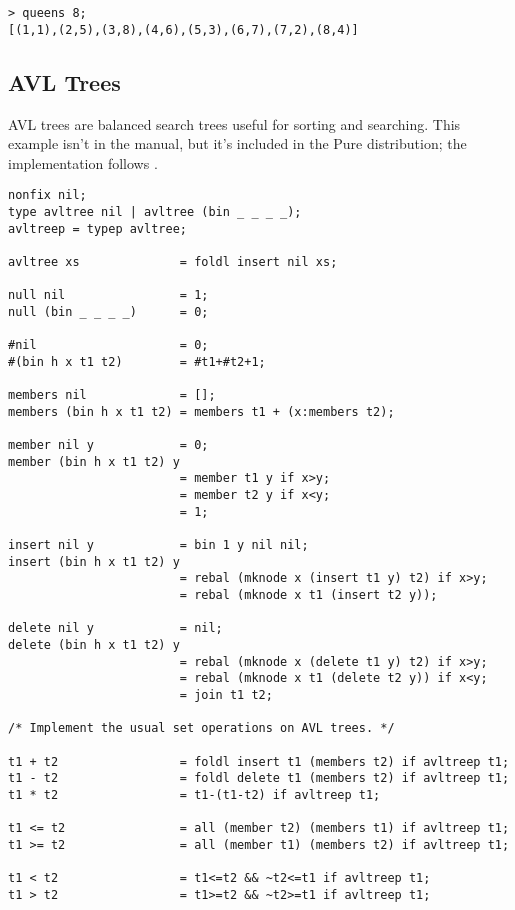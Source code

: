 \documentclass[a4paper,12pt]{article}
\begin{document}
\begin{lstlisting}
> queens 8;
[(1,1),(2,5),(3,8),(4,6),(5,3),(6,7),(7,2),(8,4)]
\end{lstlisting}

\subsection{AVL Trees}

AVL trees are balanced search trees useful for sorting and searching. This
example isn't in the manual, but it's included in the Pure distribution; the
implementation follows \cite{BiWa88}.

\begin{lstlisting}
nonfix nil;
type avltree nil | avltree (bin _ _ _ _);
avltreep = typep avltree;

avltree xs              = foldl insert nil xs;

null nil                = 1;
null (bin _ _ _ _)      = 0;

#nil                    = 0;
#(bin h x t1 t2)        = #t1+#t2+1;

members nil             = [];
members (bin h x t1 t2) = members t1 + (x:members t2);

member nil y            = 0;
member (bin h x t1 t2) y
                        = member t1 y if x>y;
                        = member t2 y if x<y;
                        = 1;

insert nil y            = bin 1 y nil nil;
insert (bin h x t1 t2) y
                        = rebal (mknode x (insert t1 y) t2) if x>y;
                        = rebal (mknode x t1 (insert t2 y));

delete nil y            = nil;
delete (bin h x t1 t2) y
                        = rebal (mknode x (delete t1 y) t2) if x>y;
                        = rebal (mknode x t1 (delete t2 y)) if x<y;
                        = join t1 t2;

/* Implement the usual set operations on AVL trees. */

t1 + t2                 = foldl insert t1 (members t2) if avltreep t1;
t1 - t2                 = foldl delete t1 (members t2) if avltreep t1;
t1 * t2                 = t1-(t1-t2) if avltreep t1;

t1 <= t2                = all (member t2) (members t1) if avltreep t1;
t1 >= t2                = all (member t1) (members t2) if avltreep t1;

t1 < t2                 = t1<=t2 && ~t2<=t1 if avltreep t1;
t1 > t2                 = t1>=t2 && ~t2>=t1 if avltreep t1;


\end{lstlisting}
\end{document}

